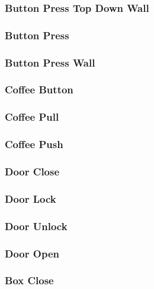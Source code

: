 {\subsubsection{Button Press Top Down Wall}


\subsubsection{Button Press}


\subsubsection{Button Press Wall}


\subsubsection{Coffee Button}


\subsubsection{Coffee Pull}



\subsubsection{Coffee Push}



\subsubsection{Door Close}


\subsubsection{Door Lock}


\subsubsection{Door Unlock}


\subsubsection{Door Open}






\subsubsection{Box Close}






}
